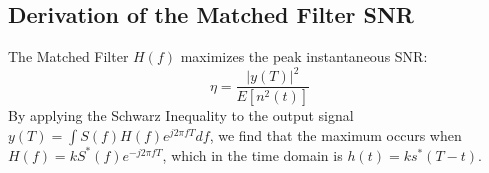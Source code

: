\subsection{Derivation of the Matched Filter SNR}
The Matched Filter $H(f)$ maximizes the peak instantaneous SNR:
\begin{equation}
    \eta = \frac{|y(T)|^2}{E[n^2(t)]}
\end{equation}
By applying the Schwarz Inequality to the output signal $y(T) = \int S(f)H(f)e^{j2\pi fT} df$, we find that the maximum occurs when $H(f) = k S^*(f) e^{-j2\pi fT}$, which in the time domain is $h(t) = k s^*(T-t)$.
